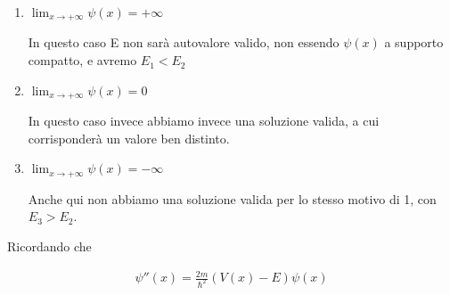 \begin{enumerate}
	\item $\lim_{x \rightarrow +\infty}\psi(x)=+\infty$
	
	\begin{figure}[!htb]
	\end{figure}
	In questo caso E non sarà autovalore valido, non essendo $\psi(x)$ a supporto compatto, e avremo $E_1<E_2$

	\item $\lim_{x \rightarrow +\infty}\psi(x)=0$

	\begin{figure}[!htb]
	\end{figure}
	In questo caso invece abbiamo invece una soluzione valida, a cui corrisponderà un valore ben distinto.
	
	\item $\lim_{x \rightarrow +\infty}\psi(x)=-\infty$

	\begin{figure}[!htb]
	\end{figure}

	Anche qui non abbiamo una soluzione valida per lo stesso motivo di 1, con $E_3>E_2$.
\end{enumerate}


Ricordando che 

\begin{align}
\psi''(x) = \frac{2m}{\hbar^2}(V(x)-E)\psi(x)
\end{align}


